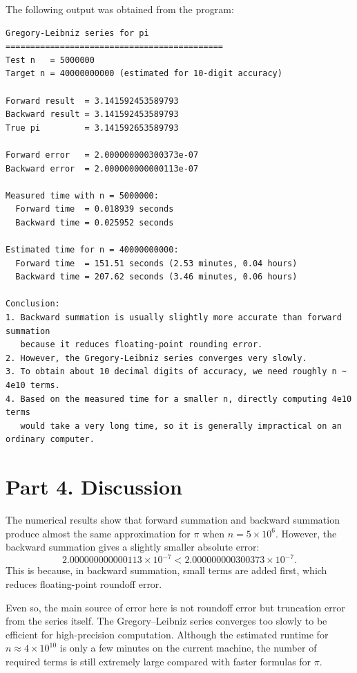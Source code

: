 \documentclass[12pt,a4paper]{article}
\begin{document}
The following output was obtained from the program:

\begin{lstlisting}
Gregory-Leibniz series for pi
============================================
Test n   = 5000000
Target n = 40000000000 (estimated for 10-digit accuracy)

Forward result  = 3.141592453589793
Backward result = 3.141592453589793
True pi         = 3.141592653589793

Forward error   = 2.000000000300373e-07
Backward error  = 2.000000000000113e-07

Measured time with n = 5000000:
  Forward time  = 0.018939 seconds
  Backward time = 0.025952 seconds

Estimated time for n = 40000000000:
  Forward time  = 151.51 seconds (2.53 minutes, 0.04 hours)
  Backward time = 207.62 seconds (3.46 minutes, 0.06 hours)

Conclusion:
1. Backward summation is usually slightly more accurate than forward summation
   because it reduces floating-point rounding error.
2. However, the Gregory-Leibniz series converges very slowly.
3. To obtain about 10 decimal digits of accuracy, we need roughly n ~ 4e10 terms.
4. Based on the measured time for a smaller n, directly computing 4e10 terms
   would take a very long time, so it is generally impractical on an ordinary computer.
\end{lstlisting}

\section{Part 4. Discussion}

The numerical results show that forward summation and backward summation produce almost the same approximation for $\pi$ when $n=5\times 10^6$. However, the backward summation gives a slightly smaller absolute error:
\[
2.000000000000113\times 10^{-7} < 2.000000000300373\times 10^{-7}.
\]
This is because, in backward summation, small terms are added first, which reduces floating-point roundoff error.

Even so, the main source of error here is not roundoff error but truncation error from the series itself. The Gregory--Leibniz series converges too slowly to be efficient for high-precision computation. Although the estimated runtime for $n\approx 4\times 10^{10}$ is only a few minutes on the current machine, the number of required terms is still extremely large compared with faster formulas for $\pi$.
\end{document}
